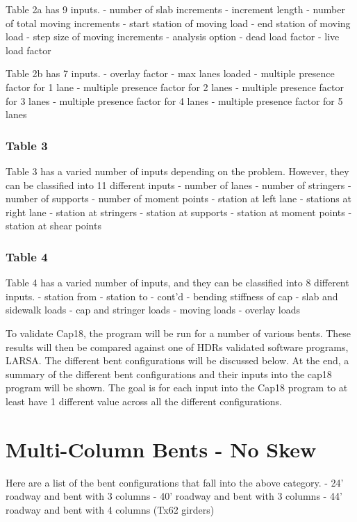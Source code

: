 \documentclass[
  letterpaper,
  DIV=11,
  numbers=noendperiod]{scrreprt}
\begin{document}
Table 2a has 9 inputs. - number of slab increments - increment length -
number of total moving increments - start station of moving load - end
station of moving load - step size of moving increments - analysis
option - dead load factor - live load factor

Table 2b has 7 inputs. - overlay factor - max lanes loaded - multiple
presence factor for 1 lane - multiple presence factor for 2 lanes -
multiple presence factor for 3 lanes - multiple presence factor for 4
lanes - multiple presence factor for 5 lanes

\subsubsection{Table 3}\label{table-3}

Table 3 has a varied number of inputs depending on the problem. However,
they can be classified into 11 different inputs - number of lanes -
number of stringers - number of supports - number of moment points -
station at left lane - stations at right lane - station at stringers -
station at supports - station at moment points - station at shear points

\subsubsection{Table 4}\label{table-4}

Table 4 has a varied number of inputs, and they can be classified into 8
different inputs. - station from - station to - cont'd - bending
stiffness of cap - slab and sidewalk loads - cap and stringer loads -
moving loads - overlay loads

To validate Cap18, the program will be run for a number of various
bents. These results will then be compared against one of HDRs validated
software programs, LARSA. The different bent configurations will be
discussed below. At the end, a summary of the different bent
configurations and their inputs into the cap18 program will be shown.
The goal is for each input into the Cap18 program to at least have 1
different value across all the different configurations.

\section{Multi-Column Bents - No
Skew}\label{multi-column-bents---no-skew}

Here are a list of the bent configurations that fall into the above
category. - 24' roadway and bent with 3 columns - 40' roadway and bent
with 3 columns - 44' roadway and bent with 4 columns (Tx62 girders)
\end{document}
